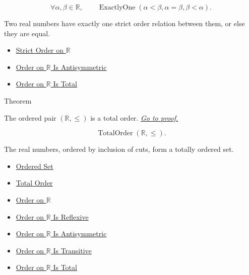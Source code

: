 \begin{remark*}
\[
\forall \alpha,\beta\in\mathbb{R},\qquad
\operatorname{ExactlyOne}(\alpha<\beta,\alpha=\beta,\beta<\alpha).
\]
\end{remark*}

\begin{remark*}[Interpretation]
Two real numbers have exactly one strict order relation between them, or else they are equal.
\end{remark*}

\begin{dependencies}
\begin{itemize}
  \item \hyperref[def:strict-order-on-r]{Strict Order on $\mathbb{R}$}
  \item \hyperref[thm:order-on-r-antisymmetric]{Order on $\mathbb{R}$ Is Antisymmetric}
  \item \hyperref[thm:order-on-r-total]{Order on $\mathbb{R}$ Is Total}
\end{itemize}
\end{dependencies}

\begin{theorembox}{Theorem}
\begin{theorem}
\label{thm:r-totally-ordered-set}
The ordered pair $(\mathbb{R},\le)$ is a total order.
\hyperref[prf:r-totally-ordered-set]{\textit{Go to proof.}}
\end{theorem}
\end{theorembox}

\begin{remark*}
\[
\operatorname{TotalOrder}(\mathbb{R},\le).
\]
\end{remark*}

\begin{remark*}[Interpretation]
The real numbers, ordered by inclusion of cuts, form a totally ordered set.
\end{remark*}

\begin{dependencies}
\begin{itemize}
  \item \hyperref[def:ordered-set]{Ordered Set}
  \item \hyperref[def:total-order]{Total Order}
  \item \hyperref[def:order-on-r]{Order on $\mathbb{R}$}
  \item \hyperref[thm:order-on-r-reflexive]{Order on $\mathbb{R}$ Is Reflexive}
  \item \hyperref[thm:order-on-r-antisymmetric]{Order on $\mathbb{R}$ Is Antisymmetric}
  \item \hyperref[thm:order-on-r-transitive]{Order on $\mathbb{R}$ Is Transitive}
  \item \hyperref[thm:order-on-r-total]{Order on $\mathbb{R}$ Is Total}
\end{itemize}
\end{dependencies}
